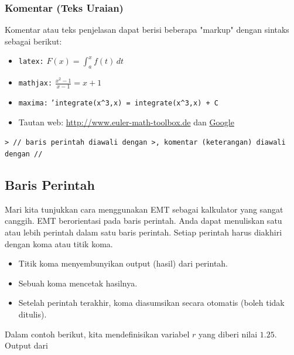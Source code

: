 \documentclass[11pt, a4paper]{article}
\begin{document}
\subsubsection*{Komentar (Teks Uraian)}

Komentar atau teks penjelasan dapat berisi beberapa "markup" dengan sintaks sebagai berikut:
\begin{itemize}
    \item \texttt{latex:} $F(x) = \int_a^x f(t)\,dt$
    \item \texttt{mathjax:} $\frac{x^2-1}{x-1}=x+1$
    \item \texttt{maxima:} \texttt{'integrate(x\^{}3,x) = integrate(x\^{}3,x) + C}
    \item Tautan web: \url{http://www.euler-math-toolbox.de} dan \href{http://www.google.de}{Google}
\end{itemize}

\noindent\texttt{\textcolor{emtcommand}{>} \textcolor{emtcomment}{// baris perintah diawali dengan >, komentar (keterangan) diawali dengan //}}

\subsection*{Baris Perintah}

Mari kita tunjukkan cara menggunakan EMT sebagai kalkulator yang sangat canggih. EMT berorientasi pada baris perintah. Anda dapat menuliskan satu atau lebih perintah dalam satu baris perintah. Setiap perintah harus diakhiri dengan koma atau titik koma.
\begin{itemize}
    \item Titik koma menyembunyikan output (hasil) dari perintah.
    \item Sebuah koma mencetak hasilnya.
    \item Setelah perintah terakhir, koma diasumsikan secara otomatis (boleh tidak ditulis).
\end{itemize}

Dalam contoh berikut, kita mendefinisikan variabel $r$ yang diberi nilai $1.25$. Output dari
\end{document}
